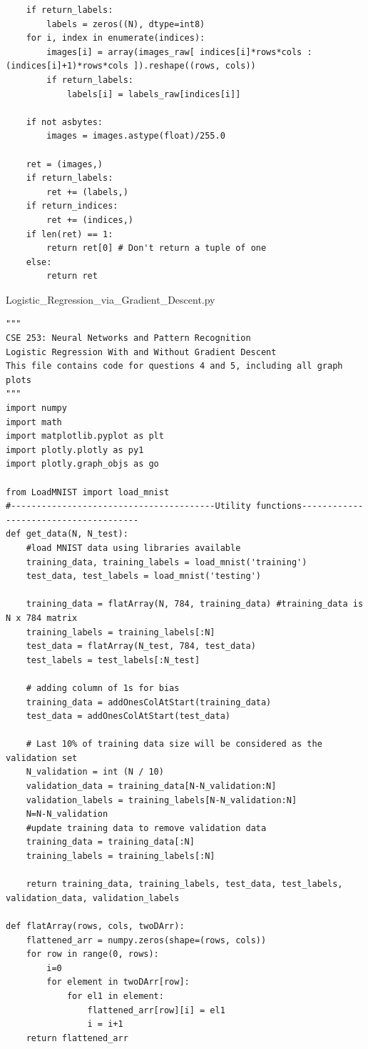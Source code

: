 \documentclass{article}
\begin{document}
\begin{lstlisting}
    if return_labels:
        labels = zeros((N), dtype=int8)
    for i, index in enumerate(indices):
        images[i] = array(images_raw[ indices[i]*rows*cols : (indices[i]+1)*rows*cols ]).reshape((rows, cols))
        if return_labels:
            labels[i] = labels_raw[indices[i]]

    if not asbytes:
        images = images.astype(float)/255.0

    ret = (images,)
    if return_labels:
        ret += (labels,)
    if return_indices:
        ret += (indices,)
    if len(ret) == 1:
        return ret[0] # Don't return a tuple of one
    else:
        return ret
\end{lstlisting}

Logistic_Regression_via_Gradient_Descent.py
\begin{lstlisting}
"""
CSE 253: Neural Networks and Pattern Recognition
Logistic Regression With and Without Gradient Descent
This file contains code for questions 4 and 5, including all graph plots
"""
import numpy
import math
import matplotlib.pyplot as plt
import plotly.plotly as py1
import plotly.graph_objs as go

from LoadMNIST import load_mnist
#----------------------------------------Utility functions--------------------------------------
def get_data(N, N_test):
    #load MNIST data using libraries available
    training_data, training_labels = load_mnist('training')    
    test_data, test_labels = load_mnist('testing')
    
    training_data = flatArray(N, 784, training_data) #training_data is N x 784 matrix
    training_labels = training_labels[:N]
    test_data = flatArray(N_test, 784, test_data)
    test_labels = test_labels[:N_test]

    # adding column of 1s for bias
    training_data = addOnesColAtStart(training_data)
    test_data = addOnesColAtStart(test_data)
    
    # Last 10% of training data size will be considered as the validation set
    N_validation = int (N / 10)
    validation_data = training_data[N-N_validation:N]
    validation_labels = training_labels[N-N_validation:N]
    N=N-N_validation
    #update training data to remove validation data
    training_data = training_data[:N]
    training_labels = training_labels[:N]    

    return training_data, training_labels, test_data, test_labels, validation_data, validation_labels
    
def flatArray(rows, cols, twoDArr):
    flattened_arr = numpy.zeros(shape=(rows, cols))
    for row in range(0, rows):
        i=0
        for element in twoDArr[row]:
            for el1 in element:
                flattened_arr[row][i] = el1            
                i = i+1
    return flattened_arr
    

\end{lstlisting}
\end{document}
